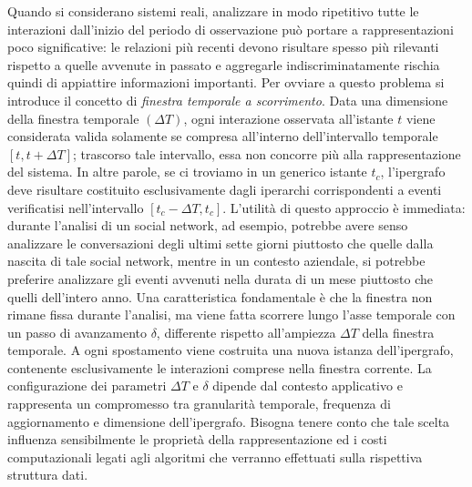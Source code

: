 Quando si considerano sistemi reali, analizzare in modo ripetitivo tutte le interazioni dall'inizio del periodo di osservazione può portare a rappresentazioni poco significative: le relazioni più recenti devono risultare spesso più rilevanti rispetto a quelle avvenute in passato e aggregarle indiscriminatamente rischia quindi di appiattire informazioni importanti.
Per ovviare a questo problema si introduce il concetto di \textit{finestra temporale a scorrimento}.
Data una dimensione della finestra temporale $(\Delta T)$, ogni interazione osservata all'istante $t$ viene considerata valida solamente se compresa all'interno dell'intervallo temporale $[t, t + \Delta T]$; trascorso tale intervallo, essa non concorre più alla rappresentazione del sistema.
In altre parole, se ci troviamo in un generico istante $t_c$, l'ipergrafo deve risultare costituito esclusivamente dagli iperarchi corrispondenti a eventi verificatisi nell'intervallo $[t_c - \Delta T, t_c]$.
L'utilità di questo approccio è immediata: durante l'analisi di un social network, ad esempio, potrebbe avere senso analizzare le conversazioni degli ultimi sette giorni piuttosto che quelle dalla nascita di tale social network, mentre in un contesto aziendale, si potrebbe preferire analizzare gli eventi avvenuti nella durata di un mese piuttosto che quelli dell'intero anno.
Una caratteristica fondamentale è che la finestra non rimane fissa durante l'analisi, ma viene fatta scorrere lungo l'asse temporale con un passo di avanzamento $\delta$, differente rispetto all'ampiezza $\Delta T$ della finestra temporale.
A ogni spostamento viene costruita una nuova istanza dell'ipergrafo, contenente esclusivamente le interazioni comprese nella finestra corrente.
La configurazione dei parametri $\Delta T$ e $\delta$ dipende dal contesto applicativo e rappresenta un compromesso tra granularità temporale, frequenza di aggiornamento e dimensione dell'ipergrafo.
Bisogna tenere conto che tale scelta influenza sensibilmente le proprietà della rappresentazione ed i costi computazionali legati agli algoritmi che verranno effettuati sulla rispettiva struttura dati.
